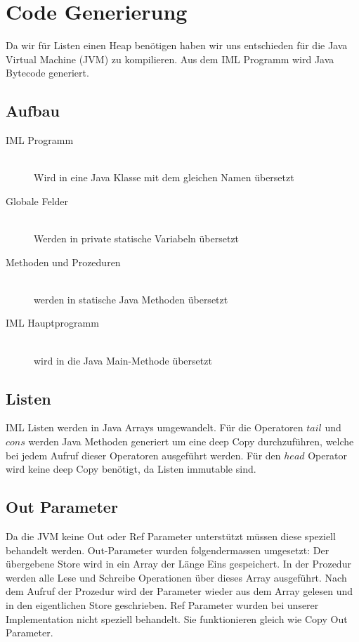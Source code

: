 \documentclass[a4paper,notitlepage,oneside]{article}
\begin{document}
\section{Code Generierung}
Da wir für Listen einen Heap benötigen haben wir uns entschieden für die Java Virtual Machine (JVM) zu kompilieren. Aus dem IML Programm wird Java Bytecode generiert.

\subsection{Aufbau}
\begin{description}
	\item[IML Programm] \hfill \\
	Wird in eine Java Klasse mit dem gleichen Namen 		übersetzt
	\item[Globale Felder] \hfill \\
	Werden in private statische Variabeln übersetzt
	\item[Methoden und Prozeduren] \hfill \\
	werden in statische Java Methoden übersetzt
	\item[IML Hauptprogramm] \hfill \\
	wird in die Java Main-Methode übersetzt
\end{description}

\subsection{Listen}
IML Listen werden in Java Arrays umgewandelt. Für die Operatoren $tail$ und $cons$ werden Java Methoden generiert um eine deep Copy durchzuführen, welche bei jedem Aufruf dieser Operatoren ausgeführt werden. Für den $head$ Operator wird keine deep Copy benötigt, da Listen immutable sind.

\subsection{Out Parameter}
Da die JVM keine Out oder Ref Parameter unterstützt müssen diese speziell behandelt werden. Out-Parameter wurden folgendermassen umgesetzt: Der übergebene Store wird in ein Array der Länge Eins gespeichert. In der Prozedur werden alle Lese und Schreibe Operationen über dieses Array ausgeführt. Nach dem Aufruf der Prozedur wird der Parameter wieder aus dem Array gelesen und in den eigentlichen Store geschrieben. Ref Parameter wurden bei unserer Implementation nicht speziell behandelt. Sie funktionieren gleich wie Copy Out Parameter.
\end{document}
